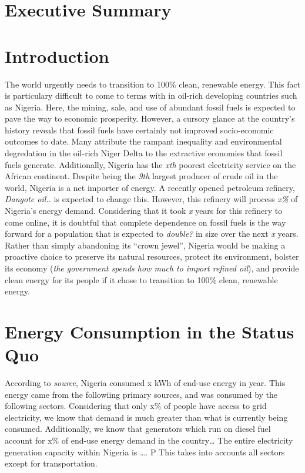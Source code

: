\documentclass{scrartcl}
\begin{document}
\hypertarget{executive-summary}{%
\section{Executive Summary}\label{executive-summary}}

\hypertarget{introduction}{%
\section{Introduction}\label{introduction}}

The world urgently needs to transition to 100\% clean, renewable energy.
This fact is particulary difficult to come to terms with in oil-rich
developing countries such as Nigeria. Here, the mining, sale, and use of
abundant fossil fuels is expected to pave the way to economic
prosperity. However, a cursory glance at the country's history reveals
that fossil fuels have certainly not improved socio-economic outcomes to
date. Many attribute the rampant inequality and environmental
degredation in the oil-rich Niger Delta to the extractive economies that
fossil fuels generate. Additionally, Nigeria has the \emph{xth} poorest
electricity service on the African continent. Despite being the
\emph{9th} largest producer of crude oil in the world, Nigeria is a net
importer of energy. A recently opened petroleum refinery, \emph{Dangote
oil..} is expected to change this. However, this refinery will process
\emph{x\%} of Nigeria's energy demand. Considering that it took \emph{x}
years for this refinery to come online, it is doubtful that complete
dependence on fossil fuels is the way forward for a population that is
expected to \emph{double?} in size over the next \emph{x} years. Rather
than simply abandoning its ``crown jewel'', Nigeria would be making a
proactive choice to preserve its natural resources, protect its
environment, bolster its economy (\emph{the government spends how much
to import refined oil}), and provide clean energy for its people if it
chose to transition to 100\% clean, renewable energy.

\hypertarget{energy-consumption-in-the-status-quo}{%
\section{Energy Consumption in the Status
Quo}\label{energy-consumption-in-the-status-quo}}

According to \emph{source}, Nigeria consumed x kWh of end-use energy in
year. This energy came from the followiing primary sources, and was
consumed by the following sectors. Considering that only x\% of people
have access to grid electricity, we know that demand is much greater
than what is currently being consumed. Additionally, we know that
generators which run on diesel fuel account for x\% of end-use energy
demand in the country\ldots{} The entire electricity generation capacity
within Nigeria is \ldots. P This takes into accounts all sectors except
for transportation.
\end{document}
